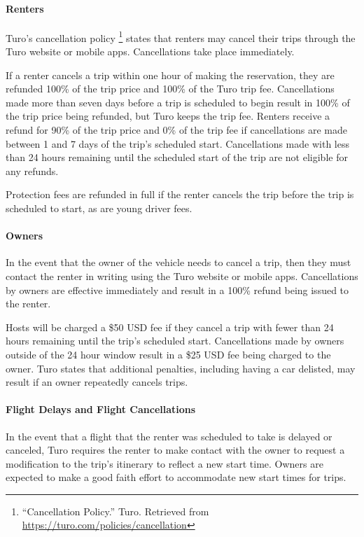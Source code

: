\documentclass[review,12pt]{elsarticle}
\begin{document}
    \paragraph{Renters}
    Turo's cancellation policy
    \footnote{``Cancellation Policy.'' Turo. Retrieved from \url{https://turo.com/policies/cancellation}
    }
    states that renters may cancel their trips through the Turo website or mobile apps. Cancellations take place immediately.

    If a renter cancels a trip within one hour of making the reservation, they are refunded 100\% of the trip price and 100\% of the Turo trip fee. Cancellations made more than seven days before a trip is scheduled to begin result in 100\% of the trip price being refunded, but Turo keeps the trip fee. Renters receive a refund for 90\% of the trip price and 0\% of the trip fee if cancellations are made between 1 and 7 days of the trip's scheduled start. Cancellations made with less than 24 hours remaining until the scheduled start of the trip are not eligible for any refunds.

    Protection fees are refunded in full if the renter cancels the trip before the trip is scheduled to start, as are young driver fees.

    \paragraph{Owners}
    In the event that the owner of the vehicle needs to cancel a trip, then they must contact the renter in writing using the Turo website or mobile apps. Cancellations by owners are effective immediately and result in a 100\% refund being issued to the renter.

    Hosts will be charged a \$50 USD fee if they cancel a trip with fewer than 24 hours remaining until the trip's scheduled start. Cancellations made by owners outside of the 24 hour window result in a \$25 USD fee being charged to the owner. Turo states that additional penalties, including having a car delisted, may result if an owner repeatedly cancels trips.

    \paragraph{Flight Delays and Flight Cancellations}
    In the event that a flight that the renter was scheduled to take is delayed or canceled, Turo requires the renter to make contact with the owner to request a modification to the trip's itinerary to reflect a new start time. Owners are expected to make a good faith effort to accommodate new start times for trips.
\end{document}
